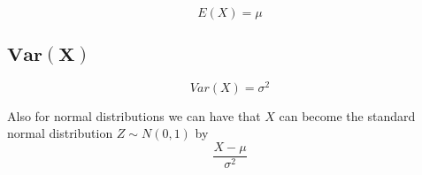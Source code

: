 \documentclass[12pt]{article}
\begin{document}
\begin{equation*}
  E(X) = \mu
\end{equation*}

\subsection{$\bm{Var(X)}$}

\begin{equation*}
  Var(X)= \sigma^{2}
\end{equation*}

Also for normal distributions we can have that $X$ can become the standard normal distribution $Z \sim N(0,1)$ by
\begin{equation*}
  \frac{X-\mu}{\sigma^{2}}
\end{equation*}
\end{document}
